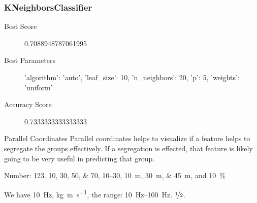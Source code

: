 \subsubsection{KNeighborsClassifier }

\begin{description}
	\item[Best Score] 0.7088948787061995
	\item[Best Parameters] 'algorithm': 'auto', 'leaf_size': 10, 'n_neighbors': 20, 'p': 5, 'weights': 'uniform'
	\item[Accuracy Score] 0.7333333333333333
\end{description}






Parallel Coordinates 
Parallel coordinates helps to visualize if a feature helps to segregate the groups effectively. If a segregation is effected, that feature is likely going to be very useful in predicting that group.


Number:
\num{123}.
\numlist{10;30;50;70},
\numrange{10}{30},
\SIlist{10;30;45}{\metre},
and
\SI{10}{\percent}



\begin{ConferenceOnly}
We have \SI{10}{\hertz},
\si{\kilogram\metre\per\second},
the range: \SIrange{10}{100}{\hertz}.
$\nicefrac[]{1}{2}$.


\end{ConferenceOnly}


